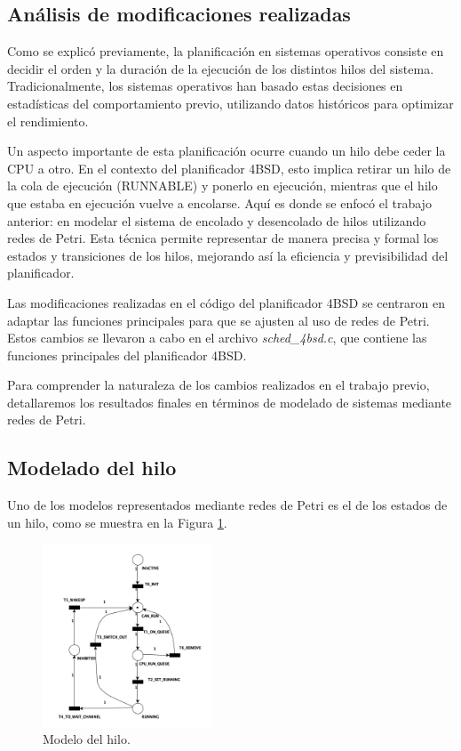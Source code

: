 \subsection{Análisis de modificaciones realizadas}

Como se explicó previamente, la planificación en sistemas operativos consiste en decidir el orden y la duración de la ejecución de los distintos hilos del sistema. Tradicionalmente, los sistemas operativos han basado estas decisiones en estadísticas del comportamiento previo, utilizando datos históricos para optimizar el rendimiento.

Un aspecto importante de esta planificación ocurre cuando un hilo debe ceder la CPU a otro. En el contexto del planificador 4BSD, esto implica retirar un hilo de la cola de ejecución (RUNNABLE) y ponerlo en ejecución, mientras que el hilo que estaba en ejecución vuelve a encolarse. Aquí es donde se enfocó el trabajo anterior: en modelar el sistema de encolado y desencolado de hilos utilizando redes de Petri. Esta técnica permite representar de manera precisa y formal los estados y transiciones de los hilos, mejorando así la eficiencia y previsibilidad del planificador.

Las modificaciones realizadas en el código del planificador 4BSD se centraron en adaptar las funciones principales para que se ajusten al uso de redes de Petri. Estos cambios se llevaron a cabo en el archivo \textit{sched\_4bsd.c}, que contiene las funciones principales del planificador 4BSD.

Para comprender la naturaleza de los cambios realizados en el trabajo previo, detallaremos los resultados finales en términos de modelado de sistemas mediante redes de Petri.

\subsection{Modelado del hilo}

Uno de los modelos representados mediante redes de Petri es el de los estados de un hilo, como se muestra en la Figura \ref{fig:threadModel}.\par

\begin{figure}[H]
    \centering
    \includegraphics[width=0.45\textwidth]{images/Thread_Net.png}
    \caption{Modelo del hilo.}
    \label{fig:threadModel}
\end{figure}

